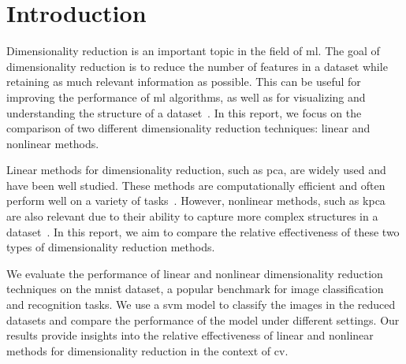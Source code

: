 \chapter{Introduction}\label{cha:introduction}




Dimensionality reduction is an important topic in the field of \gls{ml}. The goal of dimensionality reduction is to reduce the number of features in a dataset while retaining as much relevant information as possible. This can be useful for improving the performance of \gls{ml} algorithms, as well as for visualizing and understanding the structure of a dataset~\cite{dimensionality-reduction-cheng}. In this report, we focus on the comparison of two different dimensionality reduction techniques: linear and nonlinear methods.

Linear methods for dimensionality reduction, such as \gls{pca}, are widely used and have been well studied. These methods are computationally efficient and often perform well on a variety of tasks~\cite{james-statistical-learning1}. However, nonlinear methods, such as \gls{kpca} are also relevant due to their ability to capture more complex structures in a dataset~\cite{dimensionality-reduction-cheng}. In this report, we aim to compare the relative effectiveness of these two types of dimensionality reduction methods.

We evaluate the performance of linear and nonlinear dimensionality reduction techniques on the \gls{mnist} dataset, a popular benchmark for image classification and recognition tasks. We use a \gls{svm} model to classify the images in the reduced datasets and compare the performance of the model under different settings. Our results provide insights into the relative effectiveness of linear and nonlinear methods for dimensionality reduction in the context of \gls{cv}.

